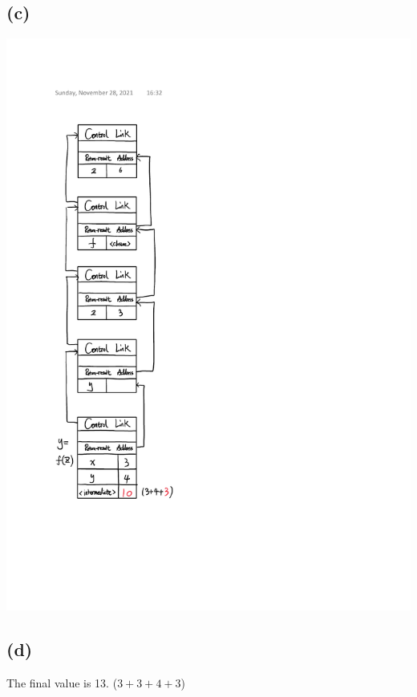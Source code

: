 \documentclass[12pt, a4paper]{article}
\begin{document}
	\subsection*{(c)}
	\begin{center}
		\includegraphics[scale=0.75]{Q4c.pdf}
	\end{center}
	
	
	\subsection*{(d)}
	The final value is 13. ($3 + 3 + 4 + 3$)
	
\end{document}
